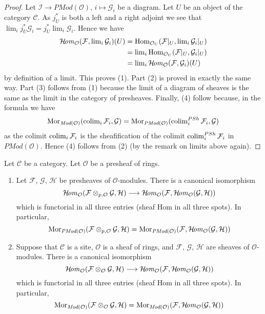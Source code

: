 \begin{proof}
Let $\mathcal{I} \to \textit{PMod}(\mathcal{O})$, $i \mapsto \mathcal{G}_i$
be a diagram. Let $U$ be an object of the category $\mathcal{C}$.
As $j_U^*$ is both a left and a right adjoint we see that
$\lim_i j_U^*\mathcal{G}_i = j_U^* \lim_i \mathcal{G}_i$.
Hence we have
\begin{align*}
\mathop{\mathcal{H}\!{\it om}}\nolimits_\mathcal{O}(\mathcal{F}, \mathop{\rm lim}\nolimits_i \mathcal{G}_i)(U)
& =
\mathop{\rm Hom}\nolimits_{\mathcal{O}_U}(\mathcal{F}|_U, \mathop{\rm lim}\nolimits_i \mathcal{G}_i|_U) \\
& =
\mathop{\rm lim}\nolimits_i \mathop{\rm Hom}\nolimits_{\mathcal{O}_U}(\mathcal{F}|_U, \mathcal{G}_i|_U) \\
& = \mathop{\rm lim}\nolimits_i \mathop{\mathcal{H}\!{\it om}}\nolimits_\mathcal{O}(\mathcal{F}, \mathcal{G}_i)(U)
\end{align*}
by definition of a limit. This proves (1). Part (2) is proved in exactly the
same way. Part (3) follows from (1) because the limit of a diagram of sheaves
is the same as the limit in the category of presheaves.
Finally, (4) follow because, in the formula we have
$$
\mathop{\rm Mor}\nolimits_{\textit{Mod}(\mathcal{O})}(
\mathop{\rm colim}\nolimits_i \mathcal{F}_i, \mathcal{G})
=
\mathop{\rm Mor}\nolimits_{\textit{PMod}(\mathcal{O})}(
\mathop{\rm colim}\nolimits^{PSh}_i \mathcal{F}_i, \mathcal{G})
$$
as the colimit $\mathop{\rm colim}\nolimits_i \mathcal{F}_i$ is the sheafification of
the colimit $\mathop{\rm colim}\nolimits^{PSh}_i \mathcal{F}_i$ in
$\textit{PMod}(\mathcal{O})$. Hence (4) follows from (2)
(by the remark on limits above again).
\end{proof}

\begin{lemma}
\label{lemma-internal-hom-adjoint-tensor}
Let $\mathcal{C}$ be a category. Let $\mathcal{O}$ be a presheaf of
rings.
\begin{enumerate}
\item Let $\mathcal{F}$, $\mathcal{G}$, $\mathcal{H}$ be
presheaves of $\mathcal{O}$-modules. There is a canonical isomorphism
$$
\mathop{\mathcal{H}\!{\it om}}\nolimits_\mathcal{O}
(\mathcal{F} \otimes_{p, \mathcal{O}} \mathcal{G}, \mathcal{H})
\longrightarrow
\mathop{\mathcal{H}\!{\it om}}\nolimits_\mathcal{O}
(\mathcal{F}, \mathop{\mathcal{H}\!{\it om}}\nolimits_\mathcal{O}(\mathcal{G}, \mathcal{H}))
$$
which is functorial in all three entries (sheaf Hom in
all three spots). In particular,
$$
\mathop{\rm Mor}\nolimits_{\textit{PMod}(\mathcal{O})}(
\mathcal{F} \otimes_{p, \mathcal{O}} \mathcal{G}, \mathcal{H})
=
\mathop{\rm Mor}\nolimits_{\textit{PMod}(\mathcal{O})}(
\mathcal{F}, \mathop{\mathcal{H}\!{\it om}}\nolimits_\mathcal{O}(\mathcal{G}, \mathcal{H}))
$$
\item
Suppose that $\mathcal{C}$ is a site, $\mathcal{O}$ is a sheaf of rings,
and $\mathcal{F}$, $\mathcal{G}$, $\mathcal{H}$ are sheaves of
$\mathcal{O}$-modules. There is a canonical isomorphism
$$
\mathop{\mathcal{H}\!{\it om}}\nolimits_\mathcal{O}
(\mathcal{F} \otimes_\mathcal{O} \mathcal{G}, \mathcal{H})
\longrightarrow
\mathop{\mathcal{H}\!{\it om}}\nolimits_\mathcal{O}
(\mathcal{F}, \mathop{\mathcal{H}\!{\it om}}\nolimits_\mathcal{O}(\mathcal{G}, \mathcal{H}))
$$
which is functorial in all three entries (sheaf Hom in
all three spots). In particular,
$$
\mathop{\rm Mor}\nolimits_{\textit{Mod}(\mathcal{O})}(
\mathcal{F} \otimes_\mathcal{O} \mathcal{G}, \mathcal{H})
=
\mathop{\rm Mor}\nolimits_{\textit{Mod}(\mathcal{O})}(
\mathcal{F}, \mathop{\mathcal{H}\!{\it om}}\nolimits_\mathcal{O}(\mathcal{G}, \mathcal{H}))
$$
\end{enumerate}
\end{lemma}

